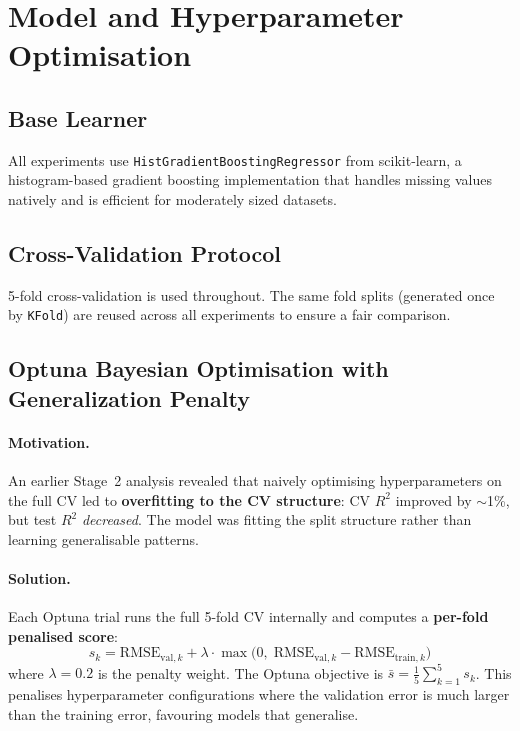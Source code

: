 \documentclass[11pt,a4paper]{article}
\newcommand{\Rtwo}{R^{2}}
\begin{document}
\section{Model and Hyperparameter Optimisation}
\label{sec:optuna}

\subsection{Base Learner}
All experiments use \texttt{HistGradientBoostingRegressor} from scikit-learn, a
histogram-based gradient boosting implementation that handles missing values
natively and is efficient for moderately sized datasets.

\subsection{Cross-Validation Protocol}
5-fold cross-validation is used throughout.  The same fold splits (generated
once by \texttt{KFold}) are reused across all experiments to ensure a fair
comparison.

\subsection{Optuna Bayesian Optimisation with Generalization Penalty}

\paragraph{Motivation.}
An earlier Stage~2 analysis revealed that naively optimising hyperparameters on
the full CV led to \textbf{overfitting to the CV structure}: CV $\Rtwo$
improved by $\sim$1\%, but test $\Rtwo$ \emph{decreased}.  The model was
fitting the split structure rather than learning generalisable patterns.

\paragraph{Solution.}
Each Optuna trial runs the full 5-fold CV internally and computes a
\textbf{per-fold penalised score}:
\[
      s_k = \text{RMSE}_{\text{val},k} + \lambda \cdot \max\!\big(0,\;
      \text{RMSE}_{\text{val},k} - \text{RMSE}_{\text{train},k}\big)
\]
where $\lambda = 0.2$ is the penalty weight.  The Optuna objective is
$\bar{s} = \tfrac{1}{5}\sum_{k=1}^{5} s_k$.  This penalises hyperparameter
configurations where the validation error is much larger than the training
error, favouring models that generalise.
\end{document}
